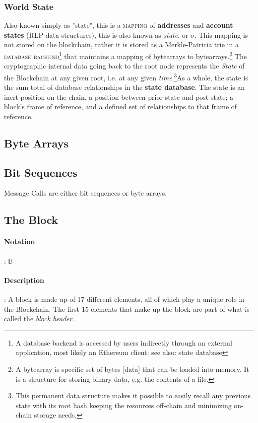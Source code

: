 \documentclass[10pt,a4paper,leqno,bibliography=totoc]{scrartcl}
\newenvironment{alphafootnotes}
{\par\edef\savedfootnotenumber{\number\value{footnote}}
\renewcommand{\thefootnote}{\alph{footnote}}
\setcounter{footnote}{0}}
{\par\setcounter{footnote}{\savedfootnotenumber}}
\begin{document}
\begin{alphafootnotes}
\begin{multicols*}{2}
				\subsubsection{World State}
					Also known simply as "state", this is a \textsc{mapping} of \textbf{addresses} and \textbf{account states} (RLP data structures), this is also known as \textit{state}, or $\sigma$. This mapping is not stored on the blockchain, rather it is stored as a Merkle-Patricia \gls{trie} in a \textsc{database backend}\footnote{A database backend is accessed by users indirectly through an external application, most likely an Ethereum client; see also: \gls{state database}} that maintains a mapping of bytearrays to bytearrays.\footnote{A bytearray is specific set of bytes [data] that can be loaded into memory. It is a structure for storing binary data, e.g. the contents of a file.} The cryptographic internal data going back to the \gls{root node} represents the \textit{State} of the Blockchain at any given root, i.e. at any given \textit{time}.\footnote{This permanent data structure makes it possible to easily recall any previous state with its root hash keeping the resources off-chain and minimizing on-chain storage needs.}As a whole, the state is the sum total of database relationships in the \textbf{ \gls{state database}}. The state is an inert position on the chain, a position between prior state and post state; a block's frame of reference, and a defined set of relationships to that frame of reference.

		\subsection{Byte Arrays}

		\subsection{Bit Sequences}
			Message Calls are either bit sequences or byte arrays.

		\subsection{The Block}
			\paragraph{Notation}: $\mathbb{B}$
			\paragraph{Description}: A block is made up of 17 different elements, all of which play a unique role in the Blockchain. The first 15 elements that make up the block are part of what is called the \textsl{block header}. 


\end{multicols*}
\end{alphafootnotes}
\end{document}
